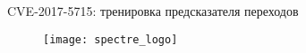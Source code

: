 \begin{frame}{\insertsubsection}

  CVE-2017-5715: тренировка предсказателя переходов

  \begin{figure}[h]
    \texttt{[image: spectre\_logo]}
  \end{figure}

  \note{


  }
\end{frame}









